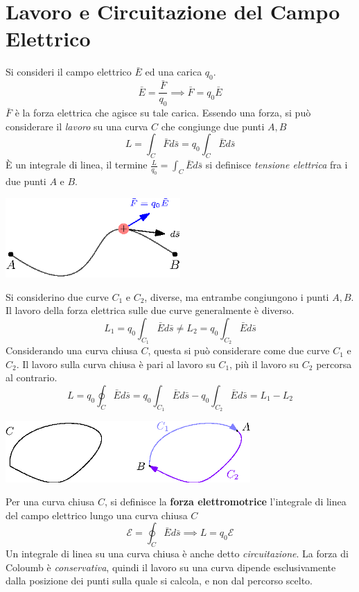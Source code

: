 \documentclass[10pt, letterpaper]{report}
\begin{document}
\flowerLine \section{Lavoro e Circuitazione del Campo Elettrico}
Si consideri il campo elettrico $\bar E$ ed una carica $q_0$.
$$ \bar E = \frac{\bar F}{q_0}\implies \bar F = q_0\bar E$$
$\bar F$ è la forza elettrica che agisce su tale carica. Essendo una forza, si può considerare il \textit{lavoro} su una curva $C$ che congiunge due punti $A,B$
$$ L=\int_C\bar F d\bar s = q_0\int_C \bar E d\bar s$$
È un integrale di linea, il termine $\frac{L}{q_0}=\int_C \bar E d\bar s$ si definisce \textit{tensione elettrica} fra i due punti $A$ e $B$.\begin{center}
    \includegraphics[width=0.5\textwidth]{images/lavoroElettrico1.eps}
\end{center}
Si considerino due curve $C_1$ e $C_2$, diverse, ma entrambe congiungono i punti $A,B$. Il lavoro della forza elettrica sulle due curve generalmente è diverso.
 $$ L_1= q_0\int_{C_1} \bar E d\bar s \ne L_2= q_0\int_{C_2} \bar E d\bar s$$
 Considerando una curva chiusa $C$, questa si può considerare come due curve $C_1$ e $C_2$. Il lavoro sulla curva chiusa è pari al lavoro su $C_1$, più il lavoro su $C_2$ percorsa al contrario.
 $$ L=q_0\oint_C \bar E d\bar s = q_0\int_{C_1} \bar E d\bar s-q_0\int_{C_2} \bar E d\bar s=L_1-L_2$$
 \begin{center}
    \includegraphics[width=0.7\textwidth]{images/curve.eps}
\end{center}
Per una curva chiusa $C$, si definisce la \textbf{forza elettromotrice} l'integrale di linea del campo elettrico lungo una curva chiusa $C$
$$ \mathscr{E}=\oint_C \bar E d\bar s\implies L = q_0\mathscr{E}$$
Un integrale di linea su una curva chiusa è anche detto \textit{circuitazione}.\acc 
La forza di Coloumb è \textit{conservativa}, quindi il lavoro su una curva dipende esclusivamente dalla posizione dei punti sulla quale si calcola, e non dal percorso scelto. 
\end{document}
